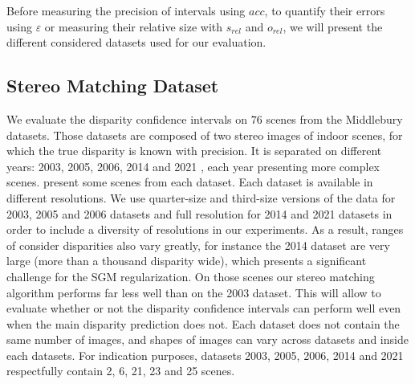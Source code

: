 Before measuring the precision of intervals using $acc$, to quantify their errors using $\varepsilon$ or measuring their relative size with $s_{rel}$ and $o_{rel}$, we will present the different considered datasets used for our evaluation.

\subsection{Stereo Matching Dataset}\label{sec:dataset}
We evaluate the disparity confidence intervals on $76$ scenes from the Middlebury datasets. Those datasets are composed of two stereo images of indoor scenes, for which the true disparity is known with precision. It is separated on different years: 2003, 2005, 2006, 2014 and 2021 \cite{scharstein_high-accuracy_2003, scharstein_learning_2007, hirschmuller_evaluation_2007, scharstein_high-resolution_2014}, each year presenting more complex scenes.  present some scenes from each dataset.  Each dataset is available in different resolutions. We use quarter-size and third-size versions of the data for 2003, 2005 and 2006 datasets and full resolution for 2014 and 2021 datasets in order to include a diversity of resolutions in our experiments. As a result, ranges of consider disparities also vary greatly, for instance the 2014 dataset are very large (more than a thousand disparity wide), which presents a significant challenge for the SGM regularization. On those scenes our stereo matching algorithm performs far less well than on the 2003 dataset. This will allow to evaluate whether or not the disparity confidence intervals can perform well even when the main disparity prediction does not. Each dataset does not contain the same number of images, and shapes of images can vary across datasets and inside each datasets. For indication purposes, datasets 2003, 2005, 2006, 2014 and 2021 respectfully contain 2, 6, 21, 23 and 25 scenes.

